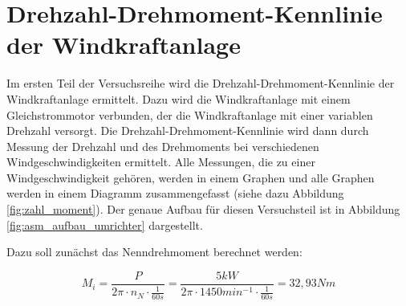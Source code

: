 \documentclass{report}
\begin{document}
\section{Drehzahl-Drehmoment-Kennlinie der Windkraftanlage}

Im ersten Teil der Versuchsreihe wird die Drehzahl-Drehmoment-Kennlinie der Windkraftanlage ermittelt. Dazu wird die Windkraftanlage mit einem Gleichstrommotor verbunden, der die Windkraftanlage mit einer variablen Drehzahl versorgt. Die Drehzahl-Drehmoment-Kennlinie wird dann durch Messung der Drehzahl und des Drehmoments bei verschiedenen Windgeschwindigkeiten ermittelt. Alle Messungen, die zu einer Windgeschwindigkeit gehören, werden in einem Graphen und alle Graphen werden in einem Diagramm zusammengefasst (siehe dazu Abbildung \ref{fig:zahl_moment}). Der genaue Aufbau für diesen Versuchsteil ist in Abbildung \ref{fig:asm_aufbau_umrichter} dargestellt.

Dazu soll zunächst das Nenndrehmoment berechnet werden:

\begin{equation}
  \label{eq:1}
  M_{i} = \frac{P}{2\pi\cdot n_{N}\cdot \frac{1}{60s}} = \frac{5kW}{2\pi \cdot 1450min^{-1} \cdot \frac{1}{60s}} = 32,93Nm
\end{equation}
\end{document}
